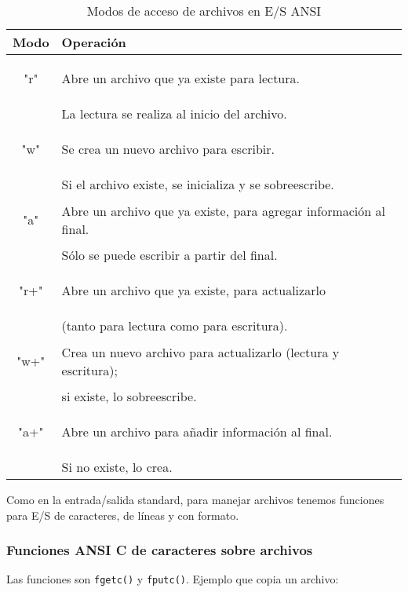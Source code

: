 \begin{table}[hbtp]
\centering
\begin{tabular}{c|l}
Modo & Operación \\
\hline
\begin{codecell}
"r"
\end{codecell} & Abre un archivo que ya existe para lectura. \\
				& La lectura se realiza al inicio del archivo.\\
\hline
\begin{codecell}
"w"
\end{codecell} & Se crea un nuevo archivo para escribir. \\
				& Si el archivo existe, se inicializa y se sobreescribe.\\
\hline
\begin{codecell}
"a" 
\end{codecell}& Abre un archivo que ya existe, para agregar información al final.\\ 
				& Sólo se puede escribir a partir del final.\\
\hline
\begin{codecell}
"r+"
\end{codecell}& Abre un archivo que ya existe, para actualizarlo \\
				& (tanto para lectura como para escritura).\\
\hline
\begin{codecell}
"w+"
\end{codecell}& Crea un nuevo archivo para actualizarlo (lectura y escritura); \\
				& si existe, lo sobreescribe.\\
\hline
\begin{codecell}
"a+"
\end{codecell}& Abre un archivo para añadir información al final. \\
				& Si no existe, lo crea.\\
\end{tabular}
\label{modos}
\caption{Modos de acceso de archivos en E/S ANSI}
\end{table}

Como en la entrada/salida standard, para manejar archivos tenemos funciones
para E/S de caracteres, de líneas y con formato.

\subsubsection{Funciones ANSI C de caracteres sobre archivos}
\label{subsubsec:esarchivosansiccaract}
Las funciones son \lstinline{fgetc()} y \lstinline{fputc()}. Ejemplo que copia un archivo:

